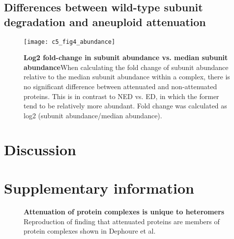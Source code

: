 \documentclass[a4paper,11pt,twoside,openright]{scrbook}
\begin{document}
\subsection{Differences between wild-type subunit degradation and aneuploid attenuation}

\begin{figure}[h]
\fcapsideright
    {\caption[Log2 fold-change in subunit abundance vs. median subunit abundance]{\sffamily\textbf{Log2 fold-change in subunit abundance vs. median subunit abundance}\newline \small When calculating the fold change of subunit abundance relative to the median subunit abundance within a complex, there is no significant difference between attenuated and non-attenuated proteins. This is in contrast to NED vs. ED, in which the former tend to be relatively more abundant. Fold change was calculated as log2 (subunit abundance/median abundance).}\label{c5f4}}
    {\texttt{[image: c5\_fig4\_abundance]}}
\end{figure}



\section{Discussion}

\clearpage

\section{Supplementary information}
\vspace{60mm}

\begin{figure}[hb]
    \caption[Attenuation of protein complexes is unique to heteromers]{\sffamily \textbf{Attenuation of protein complexes is unique to heteromers} \\ \small Reproduction of finding that attenuated proteins are members of protein complexes shown in Dephoure et al.}
    \label{c5fs1}
\end{figure}
\end{document}
